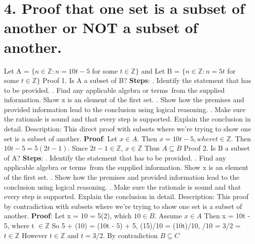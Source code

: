 \documentclass{article}
\begin{document}
\section*{4. Proof that one set is a subset of another or NOT a subset of another.}
Let A = \(\{n \in \mathbb{Z} : n = 10t - 5\) for some \(t \in \mathbb{Z}\}\) and Let B = \(\{n \in \mathbb{Z} : n = 5t\) for some \(t \in \mathbb{Z}\}\)
\newline
\newline
 Proof 1. Is A a subset of B? 
\newline \textbf{Steps}: . Identify the statement that has to be provided.
. Find any applicable algebra or terms from the supplied information. Show x is an element of the first set.
. Show how the premises and provided information lead to the conclusion using logical reasoning.
. Make sure the rationale is sound and that every step is supported.
Explain the conclusion in detail.
\newline Description: This direct proof with subsets where we're trying to show one set is a subset of another.
\newline
\textbf{Proof}: Let \( x \in A.\)
\newline
Then \(x = 10t - 5,  where t \in 
\mathbb{Z}\).
\newline
Then \(10t - 5 = 5(2t - 1)\).
\newline
Since \(2t - 1 \in \mathbb{Z}\), \(x \in \mathbb{Z}\)
\newline
Thus \(A \subseteq B\)
\newline
\newline
Proof 2. Is B a subset of A? 
\newline \textbf{Steps}: . Identify the statement that has to be provided.
. Find any applicable algebra or terms from the supplied information. Show x is an element of the first set.
. Show how the premises and provided information lead to the conclusion using logical reasoning.
. Make sure the rationale is sound and that every step is supported.
Explain the conclusion in detail.
\newline Description: This proof by contradiction with subsets where we're trying to show one set is a subset of another.
\newline
\newline
\textbf{Proof}: Let x = 10 = 5(2), which \(10 \in B\).
\newline
Assume \(x \in A\)
\newline
Then x = 10t - 5, where t \( \in \mathbb{Z} \)
\newline
So 5 + (10) = (10t - 5) + 5, (15)/10 = (10t)/10,
/10 = 3/2 = \(t \in \mathbb{Z}\)
However \(t \in \mathbb{Z}\) and \(t = 3/2\).
\newline
By contradiction \(B \subseteq C\)
\end{document}
